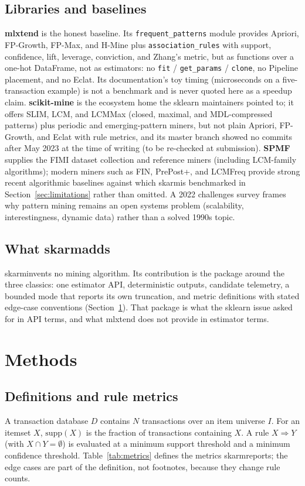 \documentclass[twocolumn,10pt]{article}
\newcommand{\skarm}{\textsf{skarm}}
\begin{document}
\subsection{Libraries and baselines}
\textbf{mlxtend} \cite{mlxtend} is the honest baseline. Its
\texttt{frequent\_patterns} module provides Apriori, FP-Growth, FP-Max,
and H-Mine plus \texttt{association\_rules} with support, confidence,
lift, leverage, conviction, and Zhang's metric, but as functions over a
one-hot DataFrame, not as estimators: no \texttt{fit} /
\texttt{get\_params} / \texttt{clone}, no Pipeline placement, and no
Eclat. Its documentation's toy timing (microseconds on a
five-transaction example) is not a benchmark and is never quoted here
as a speedup claim. \textbf{scikit-mine} \cite{scikitmine} is the
ecosystem home the sklearn maintainers pointed to; it offers SLIM,
LCM, and LCMMax (closed, maximal, and MDL-compressed patterns) plus
periodic and emerging-pattern miners, but not plain Apriori, FP-Growth,
and Eclat with rule metrics, and its master branch showed no commits
after May 2023 at the time of writing (to be re-checked at submission).
\textbf{SPMF} \cite{spmf} supplies the FIMI dataset collection and
reference miners (including LCM-family algorithms); modern miners such
as FIN, PrePost+, and LCMFreq \cite{kallay2025} provide strong recent
algorithmic baselines against which \skarm is benchmarked in
Section~\ref{sec:limitations} rather than omitted. A 2022
challenges survey \cite{fournier2022} frames why pattern mining
remains an open systems problem (scalability, interestingness, dynamic
data) rather than a solved 1990s topic.

\subsection{What \skarm adds}
\skarm invents no mining algorithm. Its contribution is the package
around the three classics: one estimator API, deterministic outputs,
candidate telemetry, a bounded mode that reports its own truncation,
and metric definitions with stated edge-case conventions
(Section~\ref{sec:methods}). That package is what the sklearn issue
asked for in API terms, and what mlxtend does not provide in estimator
terms.

\section{Methods}
\label{sec:methods}

\subsection{Definitions and rule metrics}
A transaction database $D$ contains $N$ transactions over an item
universe $I$. For an itemset $X$, $\mathrm{supp}(X)$ is the fraction of
transactions containing $X$. A rule $X \Rightarrow Y$ (with $X \cap Y =
\emptyset$) is evaluated at a minimum support threshold and a minimum
confidence threshold. Table~\ref{tab:metrics} defines the metrics
\skarm reports; the edge cases are part of the definition, not footnotes,
because they change rule counts.
\end{document}
